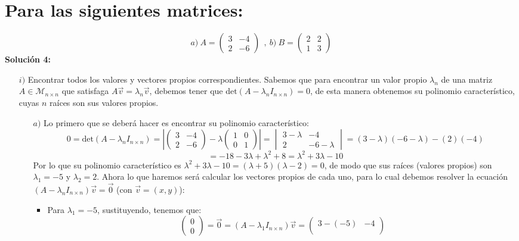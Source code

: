 \section{Para las siguientes matrices:}
\[a)~ A = \begin{pmatrix}
3 &-4\\
2 &-6
\end{pmatrix}~~ , ~b)~B =\begin{pmatrix}
2&2\\
1 &3\end{pmatrix}
\]\textbf{Soluci\'on 4:}\\
\begin{itemize}
    \item[$i)$] Encontrar todos los valores y vectores propios correspondientes.
    Sabemos que para encontrar un valor propio $\lambda_n$ de una matriz $A\in\mathcal{M}_{n\times n }$ que satisfaga $A\vec{v}=\lambda_n\vec{v}$, debemos tener que $\text{det}(A-\lambda_nI_{n\times n })=0$, de esta manera obtenemos su polinomio caracter\'istico, cuyas $n$ ra\'ices son sus valores propios.
    \begin{enumerate}
        \item[$a)$] Lo primero que se deber\'a hacer es encontrar su polinomio caracter\'istico:
        \[0=\text{det}(A-\lambda_nI_{n\times n })=\left|\begin{pmatrix}
3 &-4\\
2 &-6
\end{pmatrix}-\lambda\begin{pmatrix}
1 &0\\0 &1
\end{pmatrix}\right|=\begin{vmatrix}3-\lambda &-4\\
2 &-6-\lambda\end{vmatrix}=(3-\lambda)(-6-\lambda)-(2)(-4)\]\[=-18-3\lambda+\lambda^2+8=\lambda^2+3\lambda-10\]
Por lo que su polinomio caracter\'istico es $\lambda^2+3\lambda-10=(\lambda+5)(\lambda-2)=0$, de modo que sus ra\'ices (valores propios) son $\lambda_1=-5$ y $\lambda_2=2$. Ahora lo que haremos ser\'a calcular los vectores propios de cada uno, para lo cual debemos resolver la ecuaci\'on $(A-\lambda_nI_{n\times n })\vec{v}=\vec{0}$ (con $\vec{v}=(x,y)$):
\begin{itemize}
    \item Para $\lambda_1=-5$, sustituyendo, tenemos que:
    \[\begin{pmatrix}0\\
0\end{pmatrix}=\vec{0}=(A-\lambda_1I_{n\times n })\vec{v}=\begin{pmatrix}3-(-5) &-4\\

\end{pmatrix}\]
\end{itemize}
\end{enumerate}
\end{itemize}
